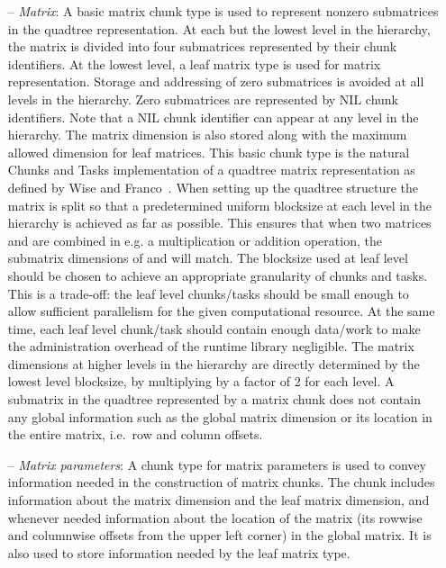 \documentclass{elsarticle}
\begin{document}
\begin{itemize}
\item[--]\emph{Matrix}: A basic matrix chunk type is used to represent
  nonzero submatrices in the quadtree representation. At each but the
  lowest level in the hierarchy, the matrix is divided into four
  submatrices represented by their chunk identifiers. At the lowest
  level, a leaf matrix type is used for matrix representation.
  Storage and addressing of zero submatrices is avoided at all levels in
  the hierarchy. Zero submatrices are represented by NIL chunk
  identifiers. Note that a NIL chunk identifier can appear at any level
  in the hierarchy.
  The matrix dimension is also stored along with the
  maximum allowed dimension for leaf matrices. This basic chunk type
  is the natural Chunks and Tasks implementation of a quadtree matrix
  representation as defined by Wise and Franco~\cite{WiseAndFranco1990}.
  When setting up the quadtree structure the matrix is split so that a
  predetermined uniform blocksize at each level in the hierarchy is
  achieved as far as possible. This ensures that when two matrices 
  and  are combined in e.g. a multiplication or addition operation,
  the submatrix dimensions of  and  will match.  The blocksize
  used at leaf level should be chosen to achieve an appropriate
  granularity of chunks and tasks.  This is a trade-off: the leaf level
  chunks/tasks should be small enough to allow sufficient parallelism
  for the given computational resource.  At the same time, each leaf
  level chunk/task should contain enough data/work to make the
  administration overhead of the runtime library negligible. The matrix
  dimensions at higher levels in the hierarchy are directly determined
  by the lowest level blocksize, by multiplying by a factor of 2 for
  each level.
  A submatrix in
  the quadtree represented by a matrix chunk does not contain any
  global information such as the global matrix dimension or its
  location in the entire matrix, i.e.~row and column offsets.
\item[--]\emph{Matrix parameters}: A chunk type for matrix parameters
  is used to convey information needed in the construction of matrix
  chunks.  The chunk includes information about the matrix dimension
  and the leaf matrix dimension, and whenever needed information about
  the location of the matrix (its rowwise and columnwise offsets from
  the upper left corner) in the global matrix. It is also used to
  store information needed by the leaf matrix type.
\end{itemize}
\end{document}
